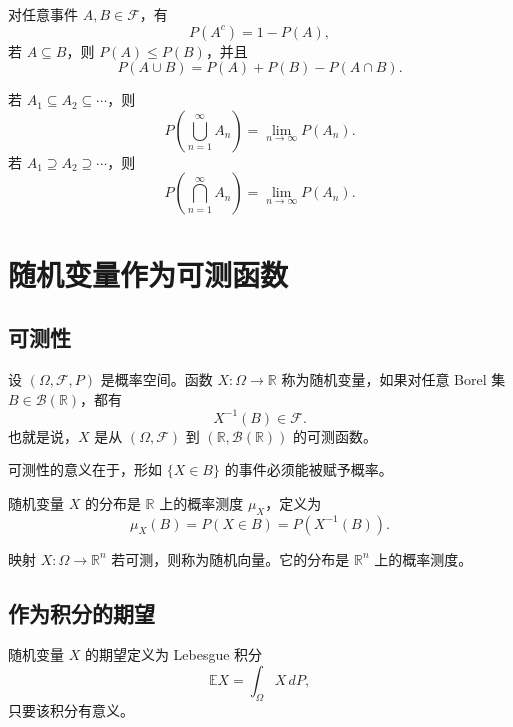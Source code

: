 \begin{proposition}[基本性质]
对任意事件 $A,B\in\mathcal{F}$，有
\[
    P(A^c)=1-P(A),
\]
若 $A\subseteq B$，则 $P(A)\le P(B)$，并且
\[
    P(A\cup B)=P(A)+P(B)-P(A\cap B).
\]
\end{proposition}

\begin{proposition}[概率的连续性]
若 $A_1\subseteq A_2\subseteq\cdots$，则
\[
    P\left(\bigcup_{n=1}^{\infty}A_n\right)=\lim_{n\to\infty}P(A_n).
\]
若 $A_1\supseteq A_2\supseteq\cdots$，则
\[
    P\left(\bigcap_{n=1}^{\infty}A_n\right)=\lim_{n\to\infty}P(A_n).
\]
\end{proposition}

\section{随机变量作为可测函数}

\subsection{可测性}

\begin{definition}[随机变量]
设 $(\Omega,\mathcal{F},P)$ 是概率空间。函数 $X:\Omega\to\mathbb{R}$ 称为随机变量，如果对任意 Borel 集 $B\in\mathcal{B}(\mathbb{R})$，都有
\[
    X^{-1}(B)\in\mathcal{F}.
\]
也就是说，$X$ 是从 $(\Omega,\mathcal{F})$ 到 $(\mathbb{R},\mathcal{B}(\mathbb{R}))$ 的可测函数。
\end{definition}

\begin{remark}
可测性的意义在于，形如 $\{X\in B\}$ 的事件必须能被赋予概率。
\end{remark}

\begin{definition}[分布]
随机变量 $X$ 的分布是 $\mathbb{R}$ 上的概率测度 $\mu_X$，定义为
\[
    \mu_X(B)=P(X\in B)=P(X^{-1}(B)).
\]
\end{definition}

\begin{definition}[随机向量]
映射 $X:\Omega\to\mathbb{R}^n$ 若可测，则称为随机向量。它的分布是 $\mathbb{R}^n$ 上的概率测度。
\end{definition}

\subsection{作为积分的期望}

\begin{definition}[期望]
随机变量 $X$ 的期望定义为 Lebesgue 积分
\[
    \mathbb{E}X=\int_\Omega X\,dP,
\]
只要该积分有意义。
\end{definition}

